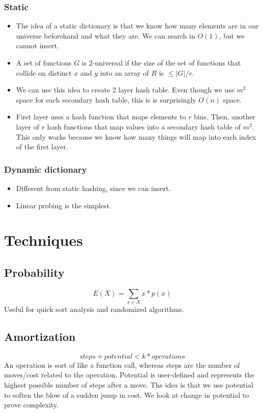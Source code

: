 \subsubsection{Static}
\begin{itemize}
    \item The idea of a static dictionary is that we know how many elements are in our universe beforehand and what they are. We can search in $O(1)$, but we cannot insert.
    \item A set of functions $G$ is 2-universal if the size of the set of functions that collide on distinct $x$ and $y$ into an array of $R$ is $\leq |G|/r$.
    \item We can use this idea to create 2 layer hash table. Even though we use $m^2$ space for each secondary hash table, this is is surprisingly $O(n)$ space.
    \item First layer uses a hash function that maps elements to $r$ bins. Then, another layer of $r$ hash functions that map values into a secondary hash table of $m^2$. This only works because we know how many things will map into each index of the first layer.
\end{itemize}
\subsubsection{Dynamic dictionary}
\begin{itemize}
    \item Different from static hashing, since we can insert. 
    \item Linear probing is the simplest.
\end{itemize}

\section{Techniques}
\subsection{Probability}
$$E(X) = \sum_{x \in X}x*p(x)$$
Useful for quick sort analysis and randomized algorithms.
\subsection{Amortization}
$$steps + potential < k * operations$$
An operation is sort of like a function call, whereas steps are the number of moves/cost related to the operation. Potential is user-defined and represents the highest possible number of steps after a move. The idea is that we use potential to soften the blow of a sudden jump in cost. We look at change in potential to prove complexity.
